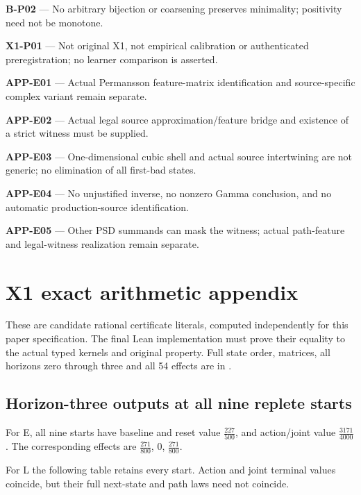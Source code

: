 \documentclass[
  11pt,
  a4paper,
]{article}
\newcommand{\codewrap}[1]{{\ttfamily\seqsplit{#1}}}
\begin{document}
\textbf{B-P02} --- No arbitrary bijection or coarsening preserves
minimality; positivity need not be monotone.

\textbf{X1-P01} --- Not original X1, not empirical calibration or
authenticated preregistration; no learner comparison is asserted.

\textbf{APP-E01} --- Actual Permansson feature-matrix identification and
source-specific complex variant remain separate.

\textbf{APP-E02} --- Actual legal source approximation/feature bridge
and existence of a strict witness must be supplied.

\textbf{APP-E03} --- One-dimensional cubic shell and actual source
intertwining are not generic; no elimination of all first-bad states.

\textbf{APP-E04} --- No unjustified inverse, no nonzero Gamma
conclusion, and no automatic production-source identification.

\textbf{APP-E05} --- Other PSD summands can mask the witness; actual
path-feature and legal-witness realization remain separate.

\newpage

\section{X1 exact arithmetic
appendix}\label{x1-exact-arithmetic-appendix}

These are candidate rational certificate literals, computed
independently for this paper specification. The final Lean
implementation must prove their equality to the actual typed kernels and
original property. Full state order, matrices, all horizons zero through
three and all 54 effects are in
\codewrap{certificates/x1\_exact\_tables.json}.

\subsection{Horizon-three outputs at all nine replete
starts}\label{horizon-three-outputs-at-all-nine-replete-starts}

For E, all nine starts have baseline and reset value
\(\frac{227}{500}\), and action/joint value \(\frac{3171}{4000}\). The
corresponding effects are \(\frac{271}{800}\), \(0\),
\(\frac{271}{800}\).

For L the following table retains every start. Action and joint terminal
values coincide, but their full next-state and path laws need not
coincide.
\end{document}
